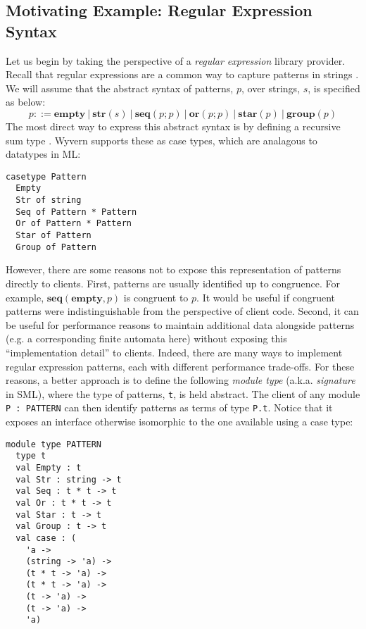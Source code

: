 \subsection{Motivating Example: Regular Expression Syntax}\label{sec:examples}
Let us begin by taking the perspective of a \emph{regular expression} library provider. Recall that regular expressions are a common way to capture patterns in strings \cite{Thompson:1968:PTR:363347.363387}. We will assume that the abstract syntax of {patterns}, $p$, over strings, $s$, is specified as below:\[p ::= \textbf{empty} ~|~ \textbf{str}(s) ~|~ \textbf{seq}(p; p) ~|~ \textbf{or}(p; p) ~|~ \textbf{star}(p) ~|~ \textbf{group}(p)\]
The most direct way to express this abstract syntax is by defining a recursive sum type \cite{pfpl}. Wyvern supports these as case types, which are analagous to datatypes in ML:

\begin{lstlisting}[numbers=none]
casetype Pattern
  Empty
  Str of string
  Seq of Pattern * Pattern
  Or of Pattern * Pattern
  Star of Pattern
  Group of Pattern
\end{lstlisting}

However, there are some reasons not to expose this representation of patterns directly to clients. First, patterns are usually identified up to congruence. For example, $\textbf{seq}(\textbf{empty}, p)$ is congruent to $p$. It would be useful if congruent patterns were indistinguishable from the perspective of client code. Second, it can be useful for performance reasons to maintain additional data alongside patterns (e.g. a corresponding finite automata here) without exposing this ``implementation detail'' to clients. Indeed, there are many ways to implement regular expression patterns, each with different performance trade-offs. For these reasons, a better approach is to define the following \emph{module type} (a.k.a. \emph{signature} in SML), where the type of patterns, \lstinline{t}, is held abstract. The client of any module \lstinline{P : PATTERN} can then identify patterns as terms of type \verb|P.t|. 
Notice that it exposes an interface otherwise isomorphic to the one available using a case type:

\begin{lstlisting}[deletekeywords={case},numbers=none]
module type PATTERN
  type t
  val Empty : t
  val Str : string -> t
  val Seq : t * t -> t
  val Or : t * t -> t
  val Star : t -> t
  val Group : t -> t
  val case : (
    'a -> 
    (string -> 'a) ->
    (t * t -> 'a) ->
    (t * t -> 'a) ->
    (t -> 'a) ->
    (t -> 'a) -> 
    'a)
\end{lstlisting}

